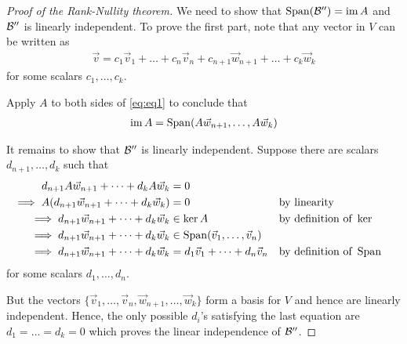 \begin{proof}[Proof of the Rank-Nullity theorem]
  We need to show that $\operatorname{Span}(\mathcal{B}'') = \operatorname{im} A$ and $\mathcal{B}''$ is linearly independent.
  To prove the first part, note that any vector in $V$ can be written as
  \begin{align}
    \tag{*}
    \label{eq:eq1}
    \vec{v} = c_1 \vec{v}_1 + \dots + c_n \vec{v}_n + c_{n+1} \vec{w}_{n+1} + \dots + c_k \vec{w}_k
  \end{align}
  for some scalars $c_1, \dots, c_k$.
  \begin{qbox}
    Apply $A$ to both sides of \eqref{eq:eq1} to conclude that
      \begin{align*}
        \operatorname{im} A = \operatorname{Span}(A\vec{w}_{n+1}, \dots, A\vec{w}_k)
      \end{align*}
  \end{qbox}
  It remains to show that $\mathcal{B}''$ is linearly independent. Suppose there are scalars $d_{n+1}, \dots, d_k$ such that
  \begin{align*}
      d_{n+1} A\vec{w}_{n+1} + \dots + d_kA \vec{w}_k &= 0 \\
      \implies A(d_{n+1} \vec{w}_{n+1} + \dots + d_k \vec{w}_k) &= 0 && \mbox{by linearity} \\
      \implies d_{n+1} \vec{w}_{n+1} + \dots + d_k \vec{w}_k &\in \ker A && \mbox{by definition of }\ker \\
      \implies d_{n+1} \vec{w}_{n+1} + \dots + d_k \vec{w}_k &\in \operatorname{Span}({\vec{v}_1, \dots, \vec{v}_n}) \\
      \implies d_{n+1} \vec{w}_{n+1} + \dots + d_k \vec{w}_k &= d_1\vec{v}_1 + \dots + d_n \vec{v}_n && \mbox{by definition of }\operatorname{Span}
  \end{align*}
  for some scalars $d_1, \dots, d_n$.

  But the vectors $\{\vec{v}_1, \dots, \vec{v}_n, \vec{w}_{n+1}, \dots, \vec{w}_k\}$ form a basis for $V$ and hence are linearly independent. Hence, the only possible $d_i$'s satisfying the last equation are $d_1 = \dots = d_k = 0$ which proves the linear independence of $\mathcal{B}''$.
\end{proof}

